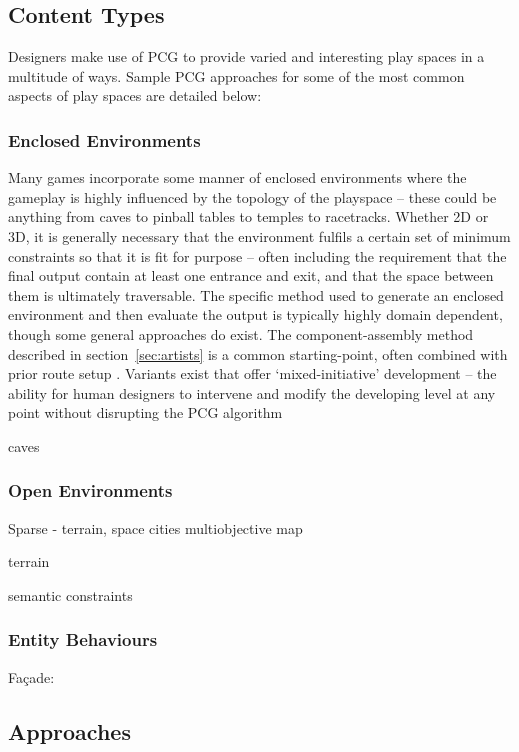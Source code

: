 \documentclass{acm_proc_article-sp}
\begin{document}
\subsection{Content Types}
Designers make use of PCG to provide varied and interesting play spaces in a multitude of ways. Sample PCG approaches for some of the most common aspects of play spaces are detailed below:

\subsubsection{Enclosed Environments}
Many games incorporate some manner of enclosed environments where the gameplay is highly influenced by the topology of the playspace -- these could be anything from caves to pinball tables to temples to racetracks. Whether 2D or 3D, it is generally necessary that the environment fulfils a certain set of minimum constraints so that it is fit for purpose -- often including the requirement that the final output contain at least one entrance and exit, and that the space between them is ultimately traversable. The specific method used to generate an enclosed environment and then evaluate the output is typically highly domain dependent, though some general approaches do exist. The component-assembly method described in section~\ref{sec:artists} is a common starting-point, often combined with prior route setup \cite{smith2011launchpad}. Variants exist that offer `mixed-initiative' development -- the ability for human designers to intervene and modify the developing level at any point without disrupting the PCG algorithm \cite{mawhorter2010procedural}

caves \cite{johnson2010cellular}

\subsubsection{Open Environments}
Sparse - terrain, space
cities \cite{carli2011survey}
multiobjective map\cite{togelius2010towards}

terrain \cite{raffe2012survey}

semantic constraints \cite{smelik2011semantic}

\subsubsection{Entity Behaviours}

Fa{\c{c}}ade: \cite{mateas2007writing}

\subsection{Approaches}
\end{document}
